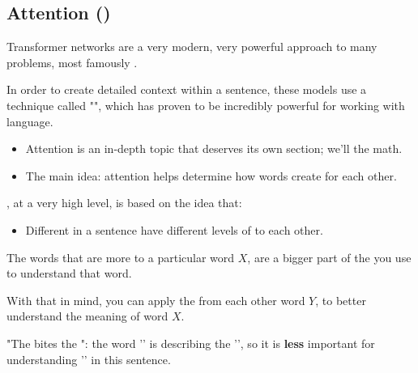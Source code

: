    \pagebreak

    \subsection{Attention ()}

        Transformer networks are a very modern, very powerful approach to many problems, most famously .

        In order to create detailed context within a sentence, these models use a technique called "", which has proven to be incredibly powerful for working with language.

        \begin{itemize}
            \item Attention is an in-depth topic that deserves its own section; we'll  the math.
            \item The main idea: attention helps determine how words create  for each other.
                \\
        \end{itemize}

        \begin{concept}
            , at a very high level, is based on the idea that:

            \begin{itemize}
                \item Different  in a sentence have different levels of  to each other.
            \end{itemize}

            The words that are more  to a particular word $X$, are a bigger part of the  you use to understand that word.

            With that in mind, you can apply the  from each other word $Y$, to better understand the meaning of word $X$.
        \end{concept}

        \miniex "The  bites the ": the word '' is describing the '', so it is \textbf{less} important for understanding '' in this sentence.


